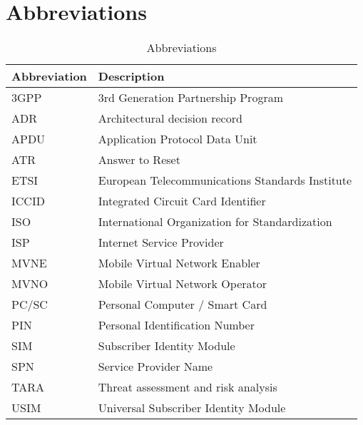 \chapter{Abbreviations}

\begin{table}[ht!]
    \centering
    \caption{Abbreviations}
    \label{tab:abbreviations}
    \begin{tabular}{|l|l|}
        \hline
        \rowcolor{lightgray}
        \textbf{Abbreviation} & \textbf{Description}            \\ \hline
        3GPP  & 3rd Generation Partnership Program              \\ \hline
        ADR   & Architectural decision record                   \\ \hline
        APDU  & Application Protocol Data Unit                  \\ \hline
        ATR   & Answer to Reset                                 \\ \hline
        ETSI  & European Telecommunications Standards Institute \\ \hline
        ICCID & Integrated Circuit Card Identifier              \\ \hline
        ISO   & International Organization for Standardization  \\ \hline
        ISP   & Internet Service Provider                       \\ \hline
        MVNE  & Mobile Virtual Network Enabler                  \\ \hline
        MVNO  & Mobile Virtual Network Operator                 \\ \hline
        PC/SC & Personal Computer / Smart Card                  \\ \hline
        PIN   & Personal Identification Number                  \\ \hline
        SIM   & Subscriber Identity Module                      \\ \hline
        SPN   & Service Provider Name                           \\ \hline
        TARA  & Threat assessment and risk analysis             \\ \hline
        USIM  & Universal Subscriber Identity Module            \\ \hline
    \end{tabular}
\end{table}
